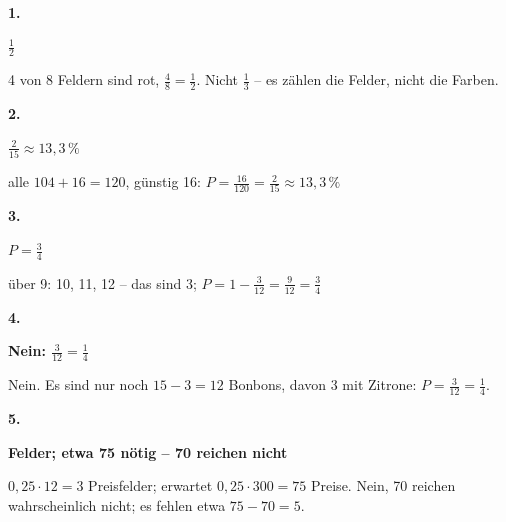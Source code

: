 \documentclass[11pt]{article}
\newcommand{\lsg}[3]{\par\noindent\begin{minipage}[t]{9mm}\textbf{#1}\end{minipage}%
  \begin{minipage}[t]{52mm}\raggedright\bfseries\boldmath #2\end{minipage}\hspace{3mm}%
  \begin{minipage}[t]{\dimexpr\linewidth-64mm\relax}\raggedright\small #3\end{minipage}\par\vspace{4pt}}
\begin{document}
\par\Needspace{25mm}\vspace{6pt}\noindent\colorbox{black!12}{}\hspace{2mm}{\bfseries Probetest}\par\vspace{4pt}
\lsg{1.}{$\frac{1}{2}$}{4 von 8 Feldern sind rot, $\frac{4}{8} = \frac{1}{2}$. Nicht $\frac{1}{3}$ – es zählen die Felder, nicht die Farben.}
\lsg{2.}{$\frac{2}{15} \approx 13{,}3\,\%$}{alle $104 + 16 = 120$, günstig 16: $P = \frac{16}{120} = \frac{2}{15} \approx 13{,}3\,\%$}
\lsg{3.}{$P = \frac{3}{4}$}{über 9: 10, 11, 12 – das sind 3; $P = 1 - \frac{3}{12} = \frac{9}{12} = \frac{3}{4}$}
\lsg{4.}{Nein: $\frac{3}{12} = \frac{1}{4}$}{Nein. Es sind nur noch $15 - 3 = 12$ Bonbons, davon 3 mit Zitrone: $P = \frac{3}{12} = \frac{1}{4}$.}
\lsg{5.}{3 Felder; etwa 75 nötig – 70 reichen nicht}{$0{,}25 \cdot 12 = 3$ Preisfelder; erwartet $0{,}25 \cdot 300 = 75$ Preise. Nein, 70 reichen wahrscheinlich nicht; es fehlen etwa $75 - 70 = 5$.}
\end{document}
